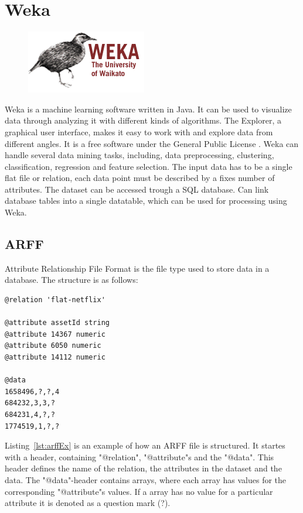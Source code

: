 


\section{Weka}

\begin{figure}
\vspace{-30pt}
\centering
\includegraphics[width = .25\textwidth]{image/Weka-logo.png}
\end{figure}


Weka is a machine learning software written in Java. It can be used to visualize data through analyzing it with different kinds of algorithms. The Explorer, a graphical user interface, makes it easy to work with and explore data from different angles. It is a free software under the General Public License \cite{GNU}. Weka can handle several data mining tasks, including, data preprocessing, clustering, classification, regression and feature selection. The input data has to be a single flat file or relation, each data point must be described by a fixes number of attributes. The dataset can be accessed trough a SQL database. Can link database tables into a single datatable, which can be used for processing using Weka.


\subsection{ARFF}
Attribute Relationship File Format is the file type used to store data in a database. The structure is as follows:

\begin{lstlisting}[caption={ARFF Example},label={lst:arffEx},captionpos=b]
@relation 'flat-netflix'

@attribute assetId string
@attribute 14367 numeric
@attribute 6050 numeric
@attribute 14112 numeric

@data
1658496,?,?,4
684232,3,3,?
684231,4,?,?
1774519,1,?,?
\end{lstlisting}

Listing~\ref{lst:arffEx} is an example of how an ARFF file is structured. It startes with a header, containing "@relation", "@attribute"s and the "@data". This header defines the name of the relation, the attributes in the dataset and the data. The "@data"-header contains arrays, where each array has values for the corresponding "@attribute"s values. If a array has no value for a particular attribute it is denoted as a question mark (?).

